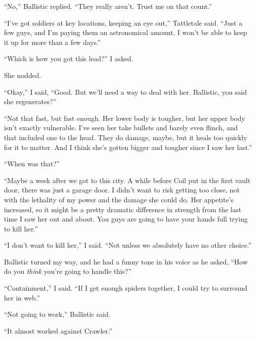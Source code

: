 ``No,'' Ballistic replied.  ``They really aren't. Trust me on that count.''



``I've got soldiers at key locations, keeping an eye out,'' Tattletale said.  ``Just a few guys, and I'm paying them an astronomical amount.  I won't be able to keep it up for more than a few days.''



``Which is how you got this lead?'' I asked.



She nodded.



``Okay,'' I said, ``Good.  But we'll need a way to deal with her.  Ballistic, you said she regenerates?''



``Not that fast, but fast enough.  Her lower body is tougher, but her upper body isn't exactly vulnerable.  I've seen her take bullets and barely even flinch, and that included one to the head.  They do damage, maybe, but it heals too quickly for it to matter.  And I think she's gotten bigger and tougher since I saw her last.''



``When was that?''



``Maybe a week after we got to this city.  A while before Coil put in the first vault door, there was just a garage door.  I didn't want to risk getting too close, not with the lethality of my power and the damage she could do.  Her appetite's increased, so it might be a pretty dramatic difference in strength from the last time I saw her out and about.  You guys are going to have your hands full trying to kill her.''



``I don't want to kill her,'' I said.  ``Not unless we absolutely have no other choice.''



Ballistic turned my way, and he had a funny tone in his voice as he asked, ``How do you \emph{think }you're going to handle this?''



``Containment,'' I said.  ``If I get enough spiders together, I could try to surround her in web.''



``Not going to work,'' Ballistic said.



``It almost worked against Crawler.''



